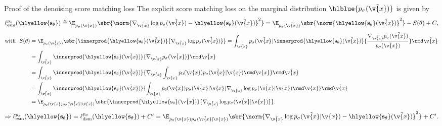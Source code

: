 \begin{frame}{Proof of the denoising score matching loss}
The explicit score matching loss on the marginal distribution $\hlblue{p_\sigma(\tilde{\v{x}})}$ is given by
    \begin{align*}
        \ell_{\mathrm{esm}}^{p_\sigma}(\hlyellow{\mathbf{s}_\theta})  \triangleq \E_{p_\sigma(\tilde{\v{x}})}\sbr{\norm{\nabla_{\tilde{\v{x}}} \log p_\sigma(\tilde{\v{x}}) - \hlyellow{\mathbf{s}_\theta}(\tilde{\v{x}})}^2}
        = \E_{p_\sigma(\tilde{\v{x}})}\sbr{\norm{\hlyellow{\mathbf{s}_\theta}(\tilde{\v{x}})}^2} -  S(\theta) + C,
    \end{align*}
    \vspace{-0.8em}
    \begin{align*}
        \text{with}\ \ S(\theta) &= \E_{p_\sigma(\tilde{\v{x}})}\sbr{\innerprod{\hlyellow{\mathbf{s}_\theta}(\tilde{\v{x}})}{\nabla_{\tilde{\v{x}}} \log p_\sigma(\tilde{\v{x}})}}
        = \int_{\tilde{\v{x}}} p_\sigma(\tilde{\v{x}}) {\innerprod{\hlyellow{\mathbf{s}_\theta}(\tilde{\v{x}})}{\frac{\nabla_{\tilde{\v{x}}} p_\sigma(\tilde{\v{x}})}{p_\sigma(\tilde{\v{x}})}}} \rmd \tilde{\v{x}} \\
        &= \int_{\tilde{\v{x}}} {\innerprod{\hlyellow{\mathbf{s}_\theta}(\tilde{\v{x}})}{\nabla_{\tilde{\v{x}}} p_\sigma(\tilde{\v{x}})}} \rmd \tilde{\v{x}} \\
        &= \int_{\tilde{\v{x}}} {\innerprod{\hlyellow{\mathbf{s}_\theta}(\tilde{\v{x}})}{\nabla_{\tilde{\v{x}}} \int_{{\v{x}}} p_0(\v{x}) p_\sigma(\tilde{\v{x}}|\v{x}) \rmd \v{x}}} \rmd \tilde{\v{x}} \\
        &= \int_{\tilde{\v{x}}} {\innerprod{\hlyellow{\mathbf{s}_\theta}(\tilde{\v{x}})}{ \int_{{\v{x}}} p_0(\v{x}) p_\sigma(\tilde{\v{x}}|\v{x}) \nabla_{\tilde{\v{x}}} \log p_\sigma(\tilde{\v{x}}|\v{x}) \rmd \v{x}}} \rmd \tilde{\v{x}} \\
        &= \E_{p_0(\v{x}) p_\sigma(\tilde{\v{x}}|\v{x})}\sbr{\innerprod{\hlyellow{\mathbf{s}_\theta}(\tilde{\v{x}})}{\nabla_{\tilde{\v{x}}} \log p_\sigma(\tilde{\v{x}}|\v{x})}}.
    \end{align*}
 $ \Rightarrow \ell_{\mathrm{esm}}^{p_\sigma}(\hlyellow{\mathbf{s}_\theta}) = \ell_{\mathrm{dsm}}^{p_\sigma}(\hlyellow{\mathbf{s}_\theta}) + C' 
= \E_{{{\scriptstyle p_0(\v{x}) p_\sigma(\tilde{\v{x}} | \v{x})}}}\sbr{\norm{\nabla_{\tilde{\v{x}}} \log p_\sigma(\tilde{\v{x}} | \v{x}) - \hlyellow{\mathbf{s}_\theta}(\tilde{\v{x}})}^2} + C'.$
\end{frame}

